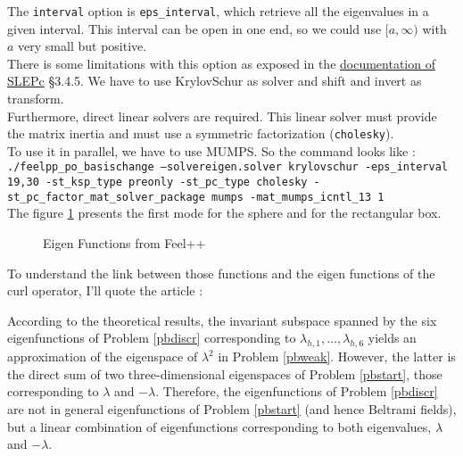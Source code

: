 The \texttt{interval}  option is \texttt{eps\_interval}, which retrieve all the eigenvalues in a given interval. This interval can be open in one end, so we could use $[a, \infty)$ with $a$ very small but positive.\\
There is some limitations with this option as exposed in the \href{http://slepc.upv.es/documentation/slepc.pdf}{documentation of SLEPc} \S 3.4.5. We have to use KrylovSchur as solver and shift and invert as transform.\\
Furthermore, direct linear solvers are required. This linear solver must provide the matrix inertia and must use a symmetric factorization (\texttt{cholesky}).\\

To use it in parallel, we have to use MUMPS. So the command looks like :\\
\texttt{./feelpp\_po\_basischange --solvereigen.solver krylovschur -eps\_interval 19,30 -st\_ksp\_type preonly -st\_pc\_type cholesky -st\_pc\_factor\_mat\_solver\_package mumps -mat\_mumps\_icntl\_13 1}\\
The figure \ref{feelModes} presents the first mode for the sphere and for the rectangular box.
\begin{figure}[H]
  \caption{Eigen Functions from Feel++}
  \label{feelModes}
\end{figure}

To understand the link between those functions and the eigen functions of the curl operator, I'll quote the article \cite{Venegas2013} :
\begin{italicquotes}
  According to the theoretical results, the invariant subspace spanned by the six eigenfunctions of Problem \ref{pbdiscr} corresponding to $\lambda_{h,1},\dots,\lambda_{h,6}$ yields an approximation of the eigenspace of $\lambda^2$ in Problem \ref{pbweak}. However, the latter is the direct sum of two three-dimensional eigenspaces of Problem \ref{pbstart}, those corresponding to $\lambda$ and $-\lambda$. Therefore, the eigenfunctions of Problem \ref{pbdiscr} are not in general eigenfunctions of Problem \ref{pbstart} (and hence Beltrami fields), but a linear combination of eigenfunctions corresponding to both eigenvalues, $\lambda$ and $-\lambda$.
\end{italicquotes}

